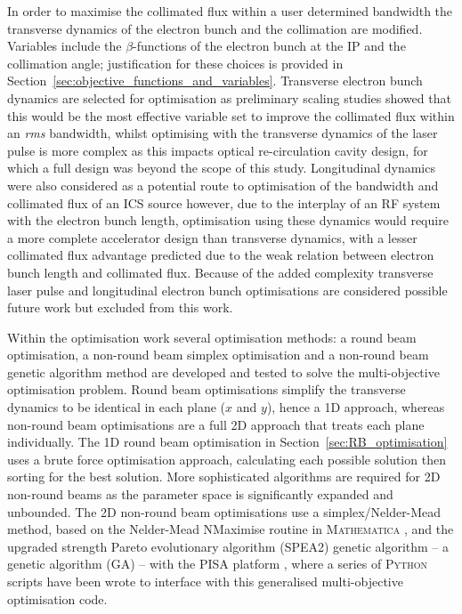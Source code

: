 \documentclass[../main.tex]{subfiles}
\begin{document}
In order to maximise the collimated flux within a user determined bandwidth the transverse dynamics of the electron bunch and the collimation are modified. Variables include the $\beta$-functions of the electron bunch at the IP and the collimation angle; justification for these choices is provided in Section~\ref{sec:objective_functions_and_variables}. Transverse electron bunch dynamics are selected for optimisation as preliminary scaling studies showed that this would be the most effective variable set to improve the collimated flux within an \textit{rms} bandwidth, whilst optimising with the transverse dynamics of the laser pulse is more complex as this impacts optical re-circulation cavity design, for which a full design was beyond the scope of this study. Longitudinal dynamics were also considered as a potential route to optimisation of the bandwidth and collimated flux of an ICS source however, due to the interplay of an RF system with the electron bunch length, optimisation using these dynamics would require a more complete accelerator design than transverse dynamics, with a lesser collimated flux advantage predicted due to the weak relation between electron bunch length and collimated flux. Because of the added complexity transverse laser pulse and longitudinal electron bunch optimisations are considered possible future work but excluded from this work.   

Within the optimisation work several optimisation methods: a round beam optimisation, a non-round beam simplex optimisation and a non-round beam genetic algorithm method are developed and tested to solve the multi-objective optimisation problem. Round beam optimisations simplify the transverse dynamics to be identical in each plane ($x$ and $y$), hence a 1D approach, whereas non-round beam optimisations are a full 2D approach that treats each plane individually. The 1D round beam optimisation in Section~\ref{sec:RB_optimisation} uses a brute force optimisation approach, calculating each possible solution then sorting for the best solution. More sophisticated algorithms are required for 2D non-round beams as the parameter space is significantly expanded and unbounded.  The 2D non-round beam optimisations use a simplex/Nelder-Mead method, based on the Nelder-Mead NMaximise routine in \textsc{Mathematica} \cite{wolfram2021nmaximize}, and the upgraded strength Pareto evolutionary algorithm (\textsc{SPEA2}) genetic algorithm \cite{zitzler2001spea2} -- a genetic algorithm (GA) -- with the \textsc{PISA} platform \cite{bleuler2003pisa}, where a series of \textsc{Python} scripts have been wrote to interface with this generalised multi-objective optimisation code.    
\end{document}
